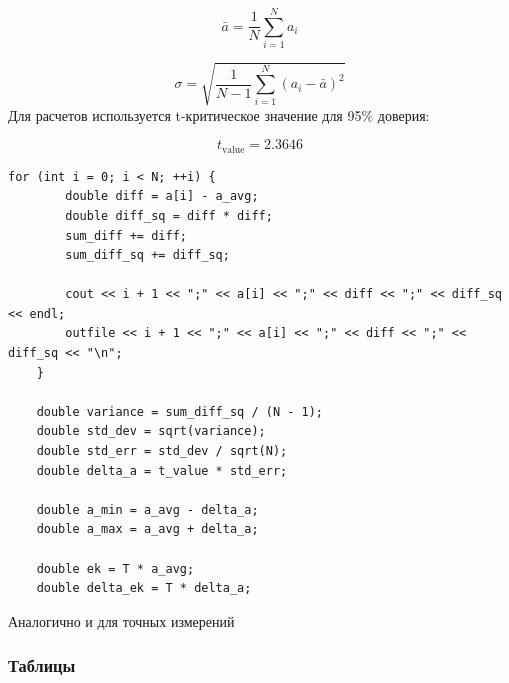 \[
\bar{a} = \frac{1}{N} \sum_{i=1}^{N} a_i
\]

\[
\sigma = \sqrt{\frac{1}{N-1} \sum_{i=1}^{N} (a_i - \bar{a})^2}
\]
Для расчетов используется t-критическое значение для 95\% доверия:

\[
t_{\text{value}} = 2.3646
\]

\begin{lstlisting}[label=listing2, caption=Функция расчета отклонений]
    for (int i = 0; i < N; ++i) {
        double diff = a[i] - a_avg;
        double diff_sq = diff * diff;
        sum_diff += diff;
        sum_diff_sq += diff_sq;

        cout << i + 1 << ";" << a[i] << ";" << diff << ";" << diff_sq << endl;
        outfile << i + 1 << ";" << a[i] << ";" << diff << ";" << diff_sq << "\n";
    }

    double variance = sum_diff_sq / (N - 1);
    double std_dev = sqrt(variance);
    double std_err = std_dev / sqrt(N);
    double delta_a = t_value * std_err;

    double a_min = a_avg - delta_a;
    double a_max = a_avg + delta_a;

    double ek = T * a_avg;
    double delta_ek = T * delta_a;
\end{lstlisting}

Аналогично и для точных измерений

\subsubsection{Таблицы}

